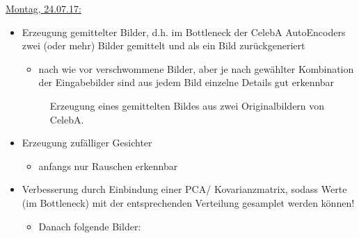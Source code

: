 \documentclass[10pt,a4paper]{report}
\begin{document}
\bigskip
\uline{Montag, 24.07.17:}
\begin{itemize}
\item Erzeugung gemittelter Bilder, d.h. im Bottleneck der CelebA AutoEncoders zwei (oder mehr) Bilder gemittelt und als ein Bild zurückgeneriert
\begin{itemize}
\item nach wie vor verschwommene Bilder, aber je nach gewählter Kombination der Eingabebilder sind aus jedem Bild einzelne Details gut erkennbar
\end{itemize}

\begin{figure}[H]
\centering
\hspace{0.37cm}
\hspace{0.5cm}
\hspace{0.5cm}
\hspace{0.5cm}
\caption{Erzeugung eines gemittelten Bildes aus zwei Originalbildern von CelebA.}
\end{figure}

\item Erzeugung zufälliger Gesichter
\begin{itemize}
\item anfangs nur Rauschen erkennbar
\end{itemize}
\item Verbesserung durch Einbindung einer PCA/ Kovarianzmatrix, sodass Werte (im Bottleneck) mit der entsprechenden Verteilung gesamplet werden können!
\begin{itemize}
\item Danach folgende Bilder:
\end{itemize}


\end{itemize}
\end{document}
